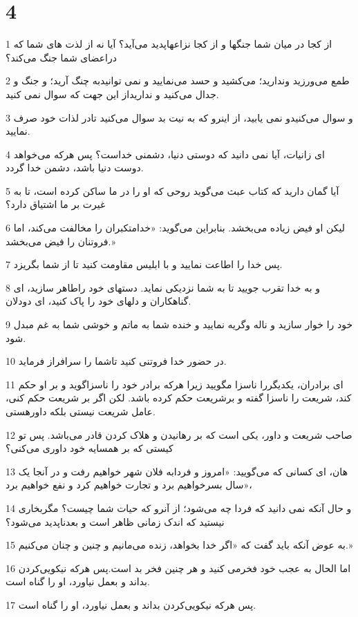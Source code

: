 \chapter{4}

\par 1 از کجا در میان شما جنگها و از کجا نزاعهاپدید می‌آید؟ آیا نه از لذت های شما که دراعضای شما جنگ می‌کند؟
\par 2 طمع می‌ورزید وندارید؛ می‌کشید و حسد می‌نمایید و نمی توانیدبه چنگ آرید؛ و جنگ و جدال می‌کنید و نداریداز این جهت که سوال نمی کنید.
\par 3 و سوال می‌کنیدو نمی یابید، از اینرو که به نیت بد سوال می‌کنید تادر لذات خود صرف نمایید.
\par 4 ‌ای زانیات، آیا نمی دانید که دوستی دنیا، دشمنی خداست؟ پس هرکه می‌خواهد دوست دنیا باشد، دشمن خدا گردد.
\par 5 آیا گمان دارید که کتاب عبث می‌گوید روحی که او را در ما ساکن کرده است، تا به غیرت بر ما اشتیاق دارد؟
\par 6 لیکن او فیض زیاده می‌بخشد. بنابراین می‌گوید: «خدامتکبران را مخالفت می‌کند، اما فروتنان را فیض می‌بخشد.»
\par 7 پس خدا را اطاعت نمایید و با ابلیس مقاومت کنید تا از شما بگریزد.
\par 8 و به خدا تقرب جویید تا به شما نزدیکی نماید. دستهای خود راطاهر سازید، ای گناهکاران و دلهای خود را پاک کنید، ای دودلان.
\par 9 خود را خوار سازید و ناله وگریه نمایید و خنده شما به ماتم و خوشی شما به غم مبدل شود.
\par 10 در حضور خدا فروتنی کنید تاشما را سرافراز فرماید.
\par 11 ‌ای برادران، یکدیگررا ناسزا مگویید زیرا هرکه برادر خود را ناسزاگوید و بر او حکم کند، شریعت را ناسزا گفته و برشریعت حکم کرده باشد. لکن اگر بر شریعت حکم کنی، عامل شریعت نیستی بلکه داورهستی.
\par 12 صاحب شریعت و داور، یکی است که بر رهانیدن و هلاک کردن قادر می‌باشد. پس تو کیستی که بر همسایه خود داوری می‌کنی؟
\par 13 هان، ای کسانی که می‌گویید: «امروز و فردابه فلان شهر خواهیم رفت و در آنجا یک سال بسرخواهیم برد و تجارت خواهیم کرد و نفع خواهیم برد»،
\par 14 و حال آنکه نمی دانید که فردا چه می‌شود؛ از آنرو که حیات شما چیست؟ مگربخاری نیستید که اندک زمانی ظاهر است و بعدناپدید می‌شود؟
\par 15 به عوض آنکه باید گفت که «اگر خدا بخواهد، زنده می‌مانیم و چنین و چنان می‌کنیم.»
\par 16 اما الحال به عجب خود فخرمی کنید و هر چنین فخر بد است.پس هرکه نیکویی‌کردن بداند و بعمل نیاورد، او را گناه است.
\par 17 پس هرکه نیکویی‌کردن بداند و بعمل نیاورد، او را گناه است.

